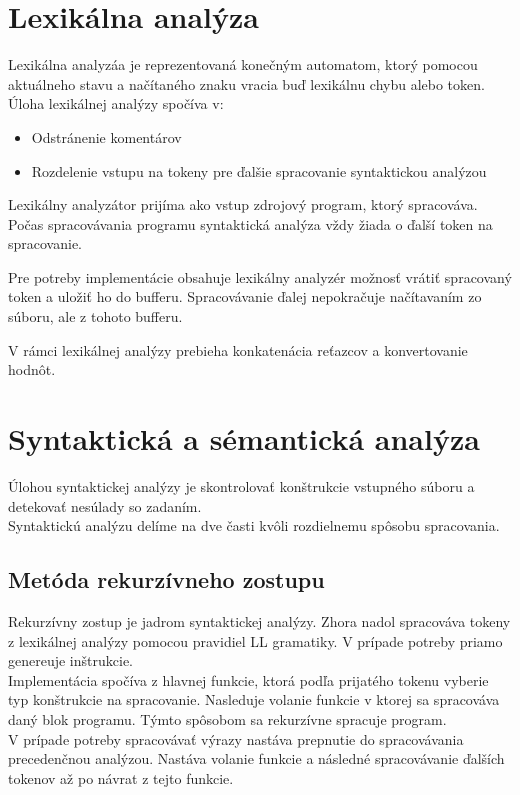 \documentclass[a4paper]{article}
\begin{document}
\section{Lexikálna analýza}
Lexikálna analyzáa je reprezentovaná konečným automatom, ktorý pomocou aktuálneho stavu a načítaného znaku vracia buď lexikálnu chybu alebo token. Úloha lexikálnej analýzy spočíva v:
\begin{itemize}
\item{Odstránenie komentárov}
\item{Rozdelenie vstupu na tokeny pre ďalšie spracovanie syntaktickou analýzou}
\end{itemize}
Lexikálny analyzátor prijíma ako vstup zdrojový program, ktorý spracováva. Počas spracovávania programu syntaktická analýza vždy žiada o ďalší token na spracovanie.

Pre potreby implementácie obsahuje lexikálny analyzér možnosť vrátiť spracovaný token a uložiť ho do bufferu. Spracovávanie ďalej nepokračuje načítavaním zo súboru, ale z tohoto bufferu.

V rámci lexikálnej analýzy prebieha konkatenácia reťazcov a konvertovanie hodnôt. 

\section{Syntaktická a sémantická analýza}
Úlohou syntaktickej analýzy je skontrolovať konštrukcie vstupného súboru a detekovať nesúlady so zadaním.\\
Syntaktickú analýzu delíme na dve časti kvôli rozdielnemu spôsobu spracovania.

\subsection{Metóda rekurzívneho zostupu}
Rekurzívny zostup je jadrom syntaktickej analýzy. Zhora nadol spracováva tokeny z lexikálnej analýzy pomocou pravidiel LL gramatiky. V prípade potreby priamo genereuje inštrukcie.\\
Implementácia spočíva z hlavnej funkcie, ktorá podľa prijatého tokenu vyberie typ konštrukcie na spracovanie. Nasleduje volanie funkcie v ktorej sa spracováva daný blok programu. Týmto spôsobom sa rekurzívne spracuje program.\\
V prípade potreby spracovávať výrazy nastáva prepnutie do spracovávania precedenčnou analýzou. Nastáva volanie funkcie a následné spracovávanie ďalších tokenov až po návrat z tejto funkcie.
\end{document}
